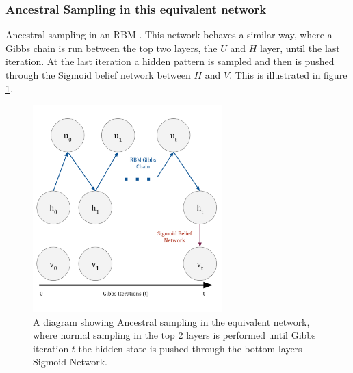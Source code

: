 \subsubsection{Ancestral Sampling in this equivalent network}

Ancestral sampling in an RBM . This network behaves a similar way, where a Gibbs chain is run between the top two layers, the $U$ and $H$ layer, until the last iteration. At the last iteration a hidden pattern is sampled and then is pushed through the Sigmoid belief network between $H$ and $V$. This is illustrated in figure \ref{F:3-Layer-RBM-Gibbs}.

\begin{figure}[h]
\begin{center}
  \includegraphics[width = 0.65\textwidth]{Assets/ORBM-Gibbs-Chain.png}
\caption{A diagram showing Ancestral sampling in the equivalent network, where normal sampling in the top 2 layers is performed until Gibbs iteration $t$ the hidden state is pushed through the bottom layers Sigmoid Network.}
\label{F:3-Layer-RBM-Gibbs}
\end{center}
\end{figure}


